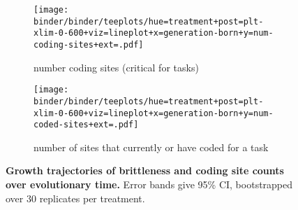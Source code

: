 \begin{figure}
    \centering
    \begin{subfigure}{\linewidth}
    \texttt{[image: binder/binder/teeplots/hue=treatment+post=plt-xlim-0-600+viz=lineplot+x=generation-born+y=num-coding-sites+ext=.pdf]}
    \caption{\footnotesize number coding sites (critical for tasks)}
    \label{fig:num-coding-sites:coding}
    \end{subfigure}

    \begin{subfigure}{\linewidth}
\texttt{[image: binder/binder/teeplots/hue=treatment+post=plt-xlim-0-600+viz=lineplot+x=generation-born+y=num-coded-sites+ext=.pdf]}
    \caption{\footnotesize number of sites that currently or have coded for a task}
    \label{fig:num-coding-sites:coded}
    \end{subfigure}
    \caption{
        \textbf{Growth trajectories of brittleness and coding site counts over evolutionary time.}
        \footnotesize
        Error bands give 95\% CI, bootstrapped over 30 replicates per treatment.
    }
    \label{fig:num-coding-sites}
\end{figure}


